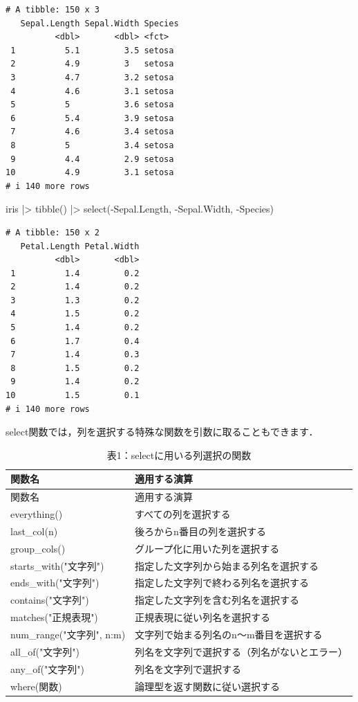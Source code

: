 \documentclass[
  letterpaper,
  DIV=11,
  numbers=noendperiod]{scrreprt}
\newenvironment{Shaded}{\begin{snugshade}}{\end{snugshade}}
\newcommand{\FunctionTok}[1]{\textcolor[rgb]{0.28,0.35,0.67}{#1}}
\newcommand{\NormalTok}[1]{\textcolor[rgb]{0.00,0.23,0.31}{#1}}
\newcommand{\SpecialCharTok}[1]{\textcolor[rgb]{0.37,0.37,0.37}{#1}}
\begin{document}
\begin{verbatim}
# A tibble: 150 x 3
   Sepal.Length Sepal.Width Species
          <dbl>       <dbl> <fct>  
 1          5.1         3.5 setosa 
 2          4.9         3   setosa 
 3          4.7         3.2 setosa 
 4          4.6         3.1 setosa 
 5          5           3.6 setosa 
 6          5.4         3.9 setosa 
 7          4.6         3.4 setosa 
 8          5           3.4 setosa 
 9          4.4         2.9 setosa 
10          4.9         3.1 setosa 
# i 140 more rows
\end{verbatim}

\begin{Shaded}
\begin{Highlighting}[]
\NormalTok{iris }\SpecialCharTok{|\textgreater{}} \FunctionTok{tibble}\NormalTok{() }\SpecialCharTok{|\textgreater{}} \FunctionTok{select}\NormalTok{(}\SpecialCharTok{{-}}\NormalTok{Sepal.Length, }\SpecialCharTok{{-}}\NormalTok{Sepal.Width, }\SpecialCharTok{{-}}\NormalTok{Species)}
\end{Highlighting}
\end{Shaded}

\begin{verbatim}
# A tibble: 150 x 2
   Petal.Length Petal.Width
          <dbl>       <dbl>
 1          1.4         0.2
 2          1.4         0.2
 3          1.3         0.2
 4          1.5         0.2
 5          1.4         0.2
 6          1.7         0.4
 7          1.4         0.3
 8          1.5         0.2
 9          1.4         0.2
10          1.5         0.1
# i 140 more rows
\end{verbatim}

select関数では，列を選択する特殊な関数を引数に取ることもできます．

\begin{longtable}[]{@{}ll@{}}
\caption{表1：selectに用いる列選択の関数}\tabularnewline
\toprule()
関数名 & 適用する演算 \\
\midrule()
\endfirsthead
\toprule()
関数名 & 適用する演算 \\
\midrule()
\endhead
everything() & すべての列を選択する \\
last\_col(n) & 後ろからn番目の列を選択する \\
group\_cols() & グループ化に用いた列を選択する \\
starts\_with("文字列") & 指定した文字列から始まる列名を選択する \\
ends\_with("文字列") & 指定した文字列で終わる列名を選択する \\
contains("文字列") & 指定した文字列を含む列名を選択する \\
matches("正規表現") & 正規表現に従い列名を選択する \\
num\_range("文字列", n:m) & 文字列で始まる列名のn～m番目を選択する \\
all\_of("文字列") & 列名を文字列で選択する（列名がないとエラー） \\
any\_of("文字列") & 列名を文字列で選択する \\
where(関数) & 論理型を返す関数に従い選択する \\
\bottomrule()
\end{longtable}
\end{document}
